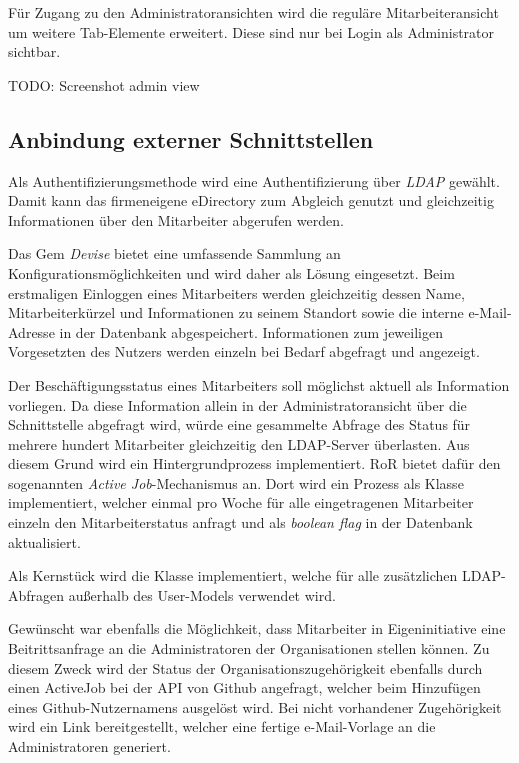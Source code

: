 Für Zugang zu den Administratoransichten wird die reguläre Mitarbeiteransicht um weitere Tab-Elemente
erweitert. Diese sind nur bei Login als Administrator sichtbar.

TODO: Screenshot admin view

\subsection{Anbindung externer Schnittstellen}
\label{sec:Anbindung externer Schnittstellen}
Als Authentifizierungsmethode wird eine Authentifizierung über \textit{\acs{LDAP}} gewählt. Damit
kann das firmeneigene eDirectory zum Abgleich genutzt und gleichzeitig Informationen über
den Mitarbeiter abgerufen werden.

Das Gem \textit{Devise} bietet eine umfassende Sammlung an Konfigurationsmöglichkeiten und wird
daher als Lösung eingesetzt. Beim erstmaligen Einloggen eines Mitarbeiters werden gleichzeitig
dessen Name, Mitarbeiterkürzel und Informationen zu seinem Standort sowie die interne
e-Mail-Adresse in der Datenbank abgespeichert. Informationen zum jeweiligen Vorgesetzten des
Nutzers werden einzeln bei Bedarf abgefragt und angezeigt.

Der Beschäftigungsstatus eines Mitarbeiters soll möglichst aktuell als Information vorliegen. Da diese
Information allein in der Administratoransicht \bzw über die Schnittstelle abgefragt wird,
würde eine gesammelte Abfrage des Status für mehrere hundert Mitarbeiter gleichzeitig den LDAP-Server
überlasten. Aus diesem Grund wird ein Hintergrundprozess implementiert. RoR bietet dafür den
sogenannten \textit{Active Job}-Mechanismus an. Dort wird ein Prozess als Klasse implementiert,
welcher einmal pro Woche für alle eingetragenen Mitarbeiter einzeln den Mitarbeiterstatus anfragt
und als \textit{boolean flag} in der Datenbank aktualisiert.
\newline
{}

Als Kernstück wird die Klasse  implementiert, welche für alle zusätzlichen
LDAP-Abfragen außerhalb des User-Models verwendet wird.
\newline
{}

Gewünscht war ebenfalls die Möglichkeit, dass Mitarbeiter \ggfs in Eigeninitiative eine
Beitrittsanfrage an die Administratoren der Organisationen stellen können. Zu diesem Zweck wird der
Status der Organisationszugehörigkeit ebenfalls durch einen ActiveJob bei der API von Github
angefragt, welcher beim Hinzufügen eines Github-Nutzernamens ausgelöst wird.
Bei nicht vorhandener Zugehörigkeit wird ein Link bereitgestellt, welcher eine fertige e-Mail-Vorlage
an die Administratoren generiert.

